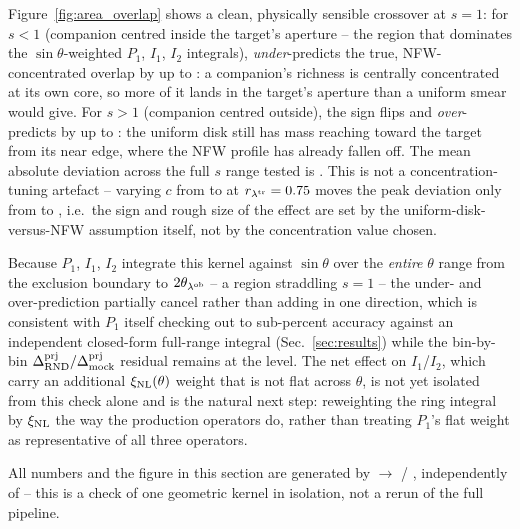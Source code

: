 Figure~\ref{fig:area_overlap} shows a clean, physically sensible
crossover at $s = 1$: for $s < 1$ (companion centred inside the target's
aperture -- the region that dominates the $\sin\theta$-weighted $P_1$,
$I_1$, $I_2$ integrals),  \emph{under}-predicts
the true, NFW-concentrated overlap by up to \AreaOverlapMaxUnder{}: a
companion's richness is centrally concentrated at its own core, so more
of it lands in the target's aperture than a uniform smear would give.
For $s > 1$ (companion centred outside), the sign flips and
 \emph{over}-predicts by up to
\AreaOverlapMaxOver{}: the uniform disk still has mass reaching toward
the target from its near edge, where the NFW profile has already fallen
off. The mean absolute deviation across the full $s$ range tested is
\AreaOverlapMeanAbs{}. This is not a concentration-tuning artefact --
varying $c$ from \AreaOverlapCFidLow{} to \AreaOverlapCFidHigh{} at
$r_{\lambda^{\rm tr}}=0.75$ moves the peak deviation only from
\AreaOverlapConcMin{} to \AreaOverlapConcMax{}, i.e.\ the sign and rough
size of the effect are set by the uniform-disk-versus-NFW assumption
itself, not by the concentration value chosen.

Because $P_1$, $I_1$, $I_2$ integrate this kernel against $\sin\theta$
over the \emph{entire} $\theta$ range from the exclusion boundary to
$2\theta_{\lambda^{\rm ob}}$ -- a region straddling $s=1$ -- the under- and
over-prediction partially cancel rather than adding in one direction,
which is consistent with $P_1$ itself checking out to sub-percent
accuracy against an independent closed-form full-range integral
(Sec.~\ref{sec:results}) while the bin-by-bin
$\Delta^{\rm prj}_{\rm RND}/\Delta^{\rm prj}_{\rm mock}$ residual remains
at the \DeltaPrjAgreeMax{} level. The net effect on $I_1$/$I_2$, which
carry an additional $\xi_{\rm NL}(\theta)$ weight that is not flat across
$\theta$, is not yet isolated from this check alone and is the natural
next step: reweighting the ring integral by $\xi_{\rm NL}$ the way the
production operators do, rather than treating $P_1$'s flat weight as
representative of all three operators.

All numbers and the figure in this section are generated by
 $\to$
 / ,
independently of  -- this is a check of
one geometric kernel in isolation, not a rerun of the full pipeline.
